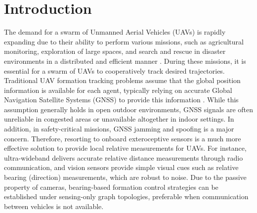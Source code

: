 \section{Introduction} \label{sec:intro}

The demand for a swarm of Unmanned Aerial Vehicles (UAVs) is rapidly expanding due to their ability to perform various missions, such as agricultural monitoring, exploration of large spaces, and search and rescue in disaster environments in a distributed and efficient manner \cite{chung2018survey}.
During these missions, it is essential for a swarm of UAVs to cooperatively track desired trajectories.
Traditional UAV formation tracking problems assume that the global position information is available for each agent, typically relying on accurate Global Navigation Satellite Systems (GNSS) to provide this information \cite{dong2016time}. While this assumption generally holds in open outdoor environments, GNSS signals are often unreliable in congested areas or unavailable altogether in indoor settings. In addition, in safety-critical missions, GNSS jamming and spoofing is a major concern. Therefore, resorting to onboard exteroceptive sensors is a much more effective solution to provide local relative measurements for UAVs. For instance, ultra-wideband delivers accurate relative distance measurements through radio communication, and vision sensors provide simple visual cues such as relative bearing (direction) measurements, which are robust to noise.
Due to the passive property of cameras, bearing-based formation control strategies can be established under sensing-only graph topologies, preferable when communication between vehicles is not available.

